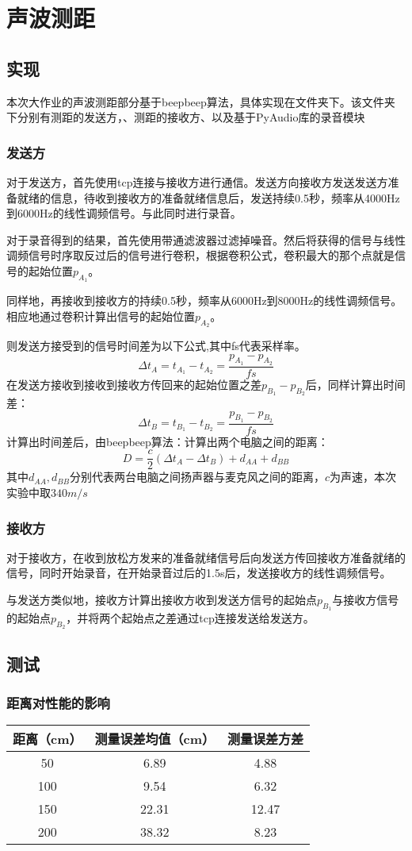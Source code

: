 \section{声波测距}
\subsection{实现}
本次大作业的声波测距部分基于beepbeep算法，具体实现在文件夹下。该文件夹下分别有测距的发送方，、测距的接收方、以及基于PyAudio库的录音模块
\subsubsection{发送方}
对于发送方，首先使用tcp连接与接收方进行通信。发送方向接收方发送发送方准备就绪的信息，待收到接收方的准备就绪信息后，发送持续0.5秒，频率从4000Hz到6000Hz的线性调频信号。与此同时进行录音。

对于录音得到的结果，首先使用带通滤波器过滤掉噪音。然后将获得的信号与线性调频信号时序取反过后的信号进行卷积，根据卷积公式，卷积最大的那个点就是信号的起始位置$p_{A_1}$。

同样地，再接收到接收方的持续0.5秒，频率从6000Hz到8000Hz的线性调频信号。相应地通过卷积计算出信号的起始位置$p_{A_2}$。

则发送方接受到的信号时间差为以下公式,其中fs代表采样率。
$$
\Delta t_A = t_{A_1} - t_{A_2}=\frac{p_{A_1}-p_{A_2}}{fs}
$$
在发送方接收到接收到接收方传回来的起始位置之差$p_{B_1}-p_{B_2}$后，同样计算出时间差：
$$
\Delta t_B = t_{B_1} - t_{B_2}=\frac{p_{B_1}-p_{B_2}}{fs}
$$
计算出时间差后，由beepbeep算法：计算出两个电脑之间的距离：
$$
D = \frac{c}{2}(\Delta t_A - \Delta t_B) + d_{AA} + d_{BB}
$$
其中$d_{AA} , d_{BB}$分别代表两台电脑之间扬声器与麦克风之间的距离，$c$为声速，本次实验中取$340m/s$
\subsubsection{接收方}
对于接收方，在收到放松方发来的准备就绪信号后向发送方传回接收方准备就绪的信号，同时开始录音，在开始录音过后的1.5s后，发送接收方的线性调频信号。

与发送方类似地，接收方计算出接收方收到发送方信号的起始点$p_{B_1}$与接收方信号的起始点$p_{B_2}$，并将两个起始点之差通过tcp连接发送给发送方。
\subsection{测试}
\subsubsection{距离对性能的影响}
\begin{table}[h!]
    \centering
    \begin{tabular}{ccc}\toprule
        距离（cm）& 测量误差均值（cm） & 测量误差方差 \\\midrule
        \bottomrule
        50  & 6.89 & 4.88 \\
        100  & 9.54 & 6.32 \\
        150  & 22.31 & 12.47 \\
        200  & 38.32 & 8.23 \\ 
    \end{tabular}
\end{table}
